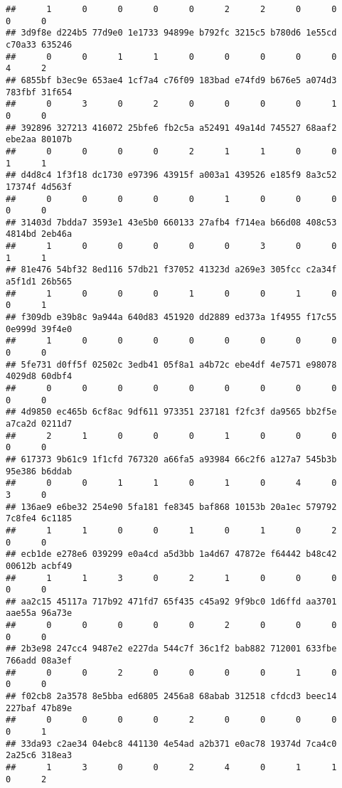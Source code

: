 \documentclass[
]{article}
\begin{document}
\begin{verbatim}
##      1      0      0      0      0      2      2      0      0      0      0 
## 3d9f8e d224b5 77d9e0 1e1733 94899e b792fc 3215c5 b780d6 1e55cd c70a33 635246 
##      0      0      1      1      0      0      0      0      0      4      2 
## 6855bf b3ec9e 653ae4 1cf7a4 c76f09 183bad e74fd9 b676e5 a074d3 783fbf 31f654 
##      0      3      0      2      0      0      0      0      1      0      0 
## 392896 327213 416072 25bfe6 fb2c5a a52491 49a14d 745527 68aaf2 ebe2aa 80107b 
##      0      0      0      0      2      1      1      0      0      1      1 
## d4d8c4 1f3f18 dc1730 e97396 43915f a003a1 439526 e185f9 8a3c52 17374f 4d563f 
##      0      0      0      0      0      1      0      0      0      0      0 
## 31403d 7bdda7 3593e1 43e5b0 660133 27afb4 f714ea b66d08 408c53 4814bd 2eb46a 
##      1      0      0      0      0      0      3      0      0      1      1 
## 81e476 54bf32 8ed116 57db21 f37052 41323d a269e3 305fcc c2a34f a5f1d1 26b565 
##      1      0      0      0      1      0      0      1      0      0      1 
## f309db e39b8c 9a944a 640d83 451920 dd2889 ed373a 1f4955 f17c55 0e999d 39f4e0 
##      1      0      0      0      0      0      0      0      0      0      0 
## 5fe731 d0ff5f 02502c 3edb41 05f8a1 a4b72c ebe4df 4e7571 e98078 4029d8 60dbf4 
##      0      0      0      0      0      0      0      0      0      0      0 
## 4d9850 ec465b 6cf8ac 9df611 973351 237181 f2fc3f da9565 bb2f5e a7ca2d 0211d7 
##      2      1      0      0      0      1      0      0      0      0      0 
## 617373 9b61c9 1f1cfd 767320 a66fa5 a93984 66c2f6 a127a7 545b3b 95e386 b6ddab 
##      0      0      1      1      0      1      0      4      0      3      0 
## 136ae9 e6be32 254e90 5fa181 fe8345 baf868 10153b 20a1ec 579792 7c8fe4 6c1185 
##      1      1      0      0      1      0      1      0      2      0      0 
## ecb1de e278e6 039299 e0a4cd a5d3bb 1a4d67 47872e f64442 b48c42 00612b acbf49 
##      1      1      3      0      2      1      0      0      0      0      0 
## aa2c15 45117a 717b92 471fd7 65f435 c45a92 9f9bc0 1d6ffd aa3701 aae55a 96a73e 
##      0      0      0      0      0      2      0      0      0      0      0 
## 2b3e98 247cc4 9487e2 e227da 544c7f 36c1f2 bab882 712001 633fbe 766add 08a3ef 
##      0      0      2      0      0      0      0      1      0      0      0 
## f02cb8 2a3578 8e5bba ed6805 2456a8 68abab 312518 cfdcd3 beec14 227baf 47b89e 
##      0      0      0      0      2      0      0      0      0      0      1 
## 33da93 c2ae34 04ebc8 441130 4e54ad a2b371 e0ac78 19374d 7ca4c0 2a25c6 318ea3 
##      1      3      0      0      2      4      0      1      1      0      2 

\end{verbatim}
\end{document}
